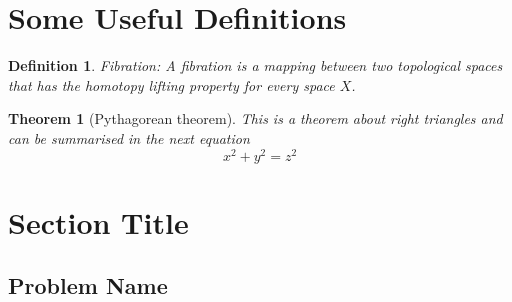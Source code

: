 \documentclass[11pt, oneside]{article}
\newtheorem{definition}{Definition}
\newtheorem{theorem}{Theorem}
\begin{document}
\section*{Some Useful Definitions}
\begin{definition}{Fibration:}
A fibration is a mapping between two topological spaces that has the homotopy lifting property for every space $X$.
\end{definition}

\begin{theorem}[Pythagorean theorem]
\label{pythagorean}
This is a theorem about right triangles and can be summarised in the next 
equation 
\[ x^2 + y^2 = z^2 \]
\end{theorem}

\hline

\section{Section Title}
\subsection{Problem Name}
\end{document}
